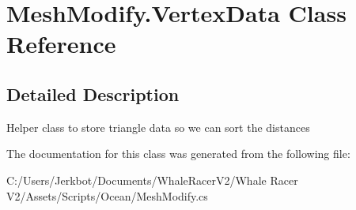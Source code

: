 \hypertarget{class_mesh_modify_1_1_vertex_data}{}\section{Mesh\+Modify.\+Vertex\+Data Class Reference}
\label{class_mesh_modify_1_1_vertex_data}


\subsection{Detailed Description}
Helper class to store triangle data so we can sort the distances 



The documentation for this class was generated from the following file\+:\begin{DoxyCompactItemize}
\item 
C\+:/\+Users/\+Jerkbot/\+Documents/\+Whale\+Racer\+V2/\+Whale Racer V2/\+Assets/\+Scripts/\+Ocean/Mesh\+Modify.\+cs\end{DoxyCompactItemize}
